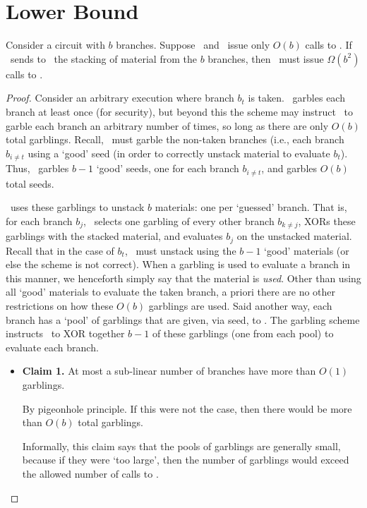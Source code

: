 \section{Lower Bound}\label{sec:lowerbound}
\begin{theorem}
Consider a circuit with $b$ branches.  Suppose \Eval\ and \Gen\ issue only
$O(b)$ calls to \Gb. If \Gen\ sends to \Eval\ the stacking of material from
the $b$ branches, then \Gen\ must issue $\Omega(b^2)$  calls to \Ev.
\end{theorem}
\begin{proof}
Consider an arbitrary execution where branch $b_t$  is taken. \Eval\
garbles each branch at least once (for security), but beyond this the
scheme may instruct \Eval\ to garble each branch an arbitrary number of
times, so long as there are only $O(b)$ total garblings.
Recall,
\Eval\
must garble the non-taken branches (i.e., each branch $b_{i\neq t}$ using a
`good' seed (in order to correctly unstack material to evaluate $b_t$).
Thus, \Eval\ garbles  $b-1$ `good' seeds, one for each branch
$b_{i\neq t}$,
and garbles  $O(b)$ total seeds.

\Eval\ uses these garblings to
unstack $b$ materials: one per `guessed' branch. That is, for each
branch $b_j$, \Eval\ selects one garbling of every other branch
$b_{k\neq j}$, XORs these garblings with the stacked material, and
evaluates $b_j$ on the unstacked material. Recall that in the case of $b_t$,
%
\Eval\ must unstack using the $b-1$ `good' materials (or else the scheme
is not correct). When a garbling is used to evaluate a branch in this
manner, we henceforth simply say that the material is \emph{used}.
Other than using all `good' materials to evaluate the taken branch, a
priori there are no other restrictions on how these $O(b)$ garblings
are used.
%
Said another way, each branch has a `pool' of garblings that are
given, via seed, to \Eval. The garbling scheme instructs \Eval\ to
XOR together $b-1$ of these garblings (one from each pool) to evaluate each
branch.

\begin{itemize}
  \item \textbf{Claim 1.} At most a sub-linear number of branches have more than
    $O(1)$ garblings.
    \begin{subproof}
      By pigeonhole principle.
      If this were not the case, then there
      would be more than $O(b)$ total garblings.

      Informally, this claim says that the pools of garblings are
      generally small, because if they were `too large', then the
      number of garblings would exceed the allowed number of calls to
      \Gb.
    \end{subproof}


\end{itemize}
\end{proof}
